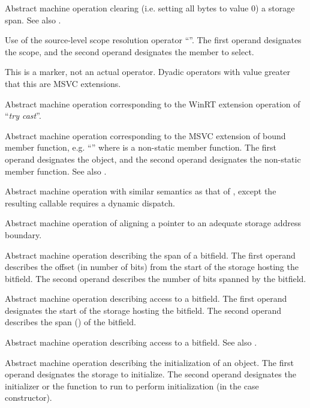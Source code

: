 Abstract machine operation clearing (i.e. setting all bytes to value $0$) a storage span.
See also .

Use of the source-level scope resolution operator ``\code{::}''.
The first operand designates the scope, and the second operand designates the member to select.

This is a marker, not an actual operator. Dyadic operators with 
value greater that this are MSVC extensions.

Abstract machine operation corresponding to the WinRT extension operation of ``\emph{try cast}''.

Abstract machine operation corresponding to the MSVC extension of bound member function, 
e.g. ``'' where  is a non-static member function.  
The first operand designates the object,
and the second operand designates the non-static member function.
See also .

Abstract machine operation with similar semantics as that of , except
the resulting callable requires a dynamic dispatch.

Abstract machine operation of aligning a pointer to an adequate storage address boundary.

Abstract machine operation describing the span of a bitfield.
The first operand describes the offset (in number of bits) from the start of the storage hosting the bitfield.
The second operand describes the number of bits spanned by the bitfield.

Abstract machine operation describing access to a bitfield.
The first operand designates the start of the storage hosting the bitfield.
The second operand describes the span () of the bitfield.

Abstract machine operation describing access to a bitfield.  
See also .

Abstract machine operation describing the initialization of an object.
The first operand designates the storage to initialize.
The second operand designates the initializer or the function to run to perform initialization (in the case constructor).

